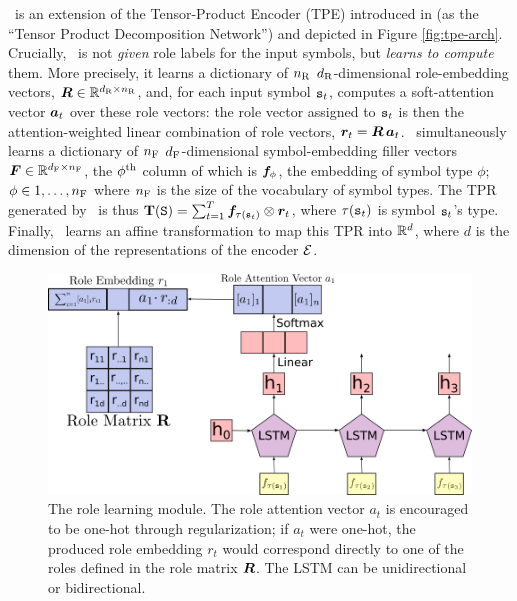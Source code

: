 \RLN\ is an extension of the Tensor-Product Encoder (TPE) introduced in \citet{mccoy} (as the ``Tensor Product Decomposition Network'') and depicted in Figure \ref{fig:tpe-arch}. 
Crucially, \RLN\ is not \textit{given} role labels for the input symbols, but \textit{learns to compute} them.
More precisely, it learns a dictionary of $n_{\mathrm{R}}$ $d_{\mathrm{R}}$-dimensional role-embedding vectors, 
${\bm{R}} \in \mathbb{R}^{d_{\mathrm{R}} \times n_{\mathrm{R}}}$, and, for each input symbol 
${\mathtt{s}}_t$, computes a soft-attention vector ${\bm{a}}_t$ over these role vectors: 
the role vector assigned to ${\mathtt{s}}_t$ is then the attention-weighted linear combination of role vectors, ${\bm{r}}_t = {\bm{R}}\, {\bm{a}}_t$. \RLN\ simultaneously learns a dictionary of $n_{\mathrm{F}}$ $d_{\mathrm{F}}$-dimensional symbol-embedding filler vectors ${\bm{F}} \in \mathbb{R}^{d_{\mathrm{F}} \times n_{\mathrm{F}}}$, the $\phi^{{\mathrm{th}}}$ column of which is ${\bm{f}}_\phi$, the embedding of symbol type $\phi$; $\phi \in 1, \ldots, n_{\mathrm{F}}$ where $n_{\mathrm{F}}$ is the size of the vocabulary of symbol types.
The TPR generated by \RLN\ is thus ${\mathbf{T}}({\mathtt{S}}) = \sum_{t=1}^T {\bm{f}}_{\tau({\mathtt{s}}_t)} \otimes {\bm{r}}_t$, where $\tau({\mathtt{s}}_t)$ is symbol ${\mathtt{s}}_t$'s type.
Finally, \RLN\ learns an affine transformation to map this TPR into $\mathbb{R}^d$, where $d$ is the dimension of the representations of the encoder ${\mathcal{E}}$.

\begin{figure}[t]
    \captionsetup{width=\columnwidth}
    \includegraphics[width=\columnwidth]{images/rldn/role_assigner_shrink}
    \caption{The role learning module. The role attention vector $a_t$ is encouraged to be one-hot through regularization; if $a_t$ were one-hot, the produced role embedding $r_t$ would correspond directly to one of the roles defined in the role matrix ${\bm{R}}$. The LSTM can be unidirectional or bidirectional.}
    \label{fig:role_learner}
\end{figure}

